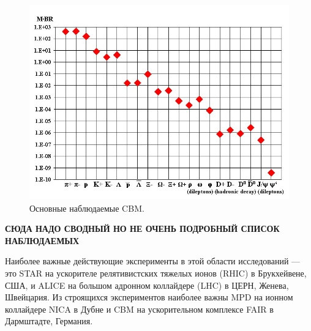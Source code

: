 \begin{figure}[H]
\includegraphics[width=1.0\textwidth]{pictures/CBM_observables.png}
\caption{Основные наблюдаемые CBM.}
\label{fig:CBMParticlesYields}
\end{figure}


\textbf{СЮДА НАДО СВОДНЫЙ НО НЕ ОЧЕНЬ ПОДРОБНЫЙ СПИСОК НАБЛЮДАЕМЫХ}

Наиболее важные действующие эксперименты в этой области исследований --- это STAR на ускорителе релятивистских тяжелых ионов (RHIC) в Брукхейвене, США, и ALICE на большом адронном коллайдере (LHC) в ЦЕРН, Женева, Швейцария. Из строящихся экспериментов наиболее важны MPD на ионном коллайдере NICA в Дубне и CBM на ускорительном комплексе FAIR в Дармштадте, Германия.




